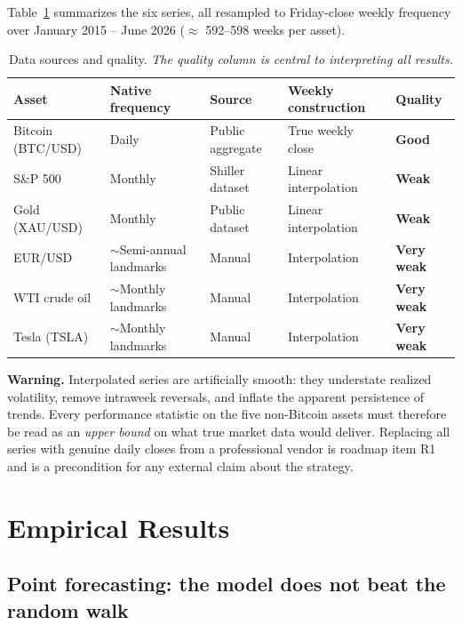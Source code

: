 \documentclass[11pt,a4paper]{article}
\begin{document}
Table~\ref{tab:data} summarizes the six series, all resampled to Friday-close weekly frequency over January 2015 -- June 2026 ($\approx$ 592--598 weeks per asset).

\begin{table}[H]
\centering\small
\caption{Data sources and quality. \emph{The quality column is central to interpreting all results.}}
\label{tab:data}
\begin{tabular}{lllll}
\toprule
Asset & Native frequency & Source & Weekly construction & Quality \\
\midrule
Bitcoin (BTC/USD) & Daily & Public aggregate & True weekly close & \textbf{Good} \\
S\&P 500 & Monthly & Shiller dataset & Linear interpolation & \textbf{Weak} \\
Gold (XAU/USD) & Monthly & Public dataset & Linear interpolation & \textbf{Weak} \\
EUR/USD & $\sim$Semi-annual landmarks & Manual & Interpolation & \textbf{Very weak} \\
WTI crude oil & $\sim$Monthly landmarks & Manual & Interpolation & \textbf{Very weak} \\
Tesla (TSLA) & $\sim$Monthly landmarks & Manual & Interpolation & \textbf{Very weak} \\
\bottomrule
\end{tabular}
\end{table}

\noindent\textbf{Warning.} Interpolated series are artificially smooth: they understate realized volatility, remove intraweek reversals, and inflate the apparent persistence of trends. Every performance statistic on the five non-Bitcoin assets must therefore be read as an \emph{upper bound} on what true market data would deliver. Replacing all series with genuine daily closes from a professional vendor is roadmap item R1 and is a precondition for any external claim about the strategy.

\section{Empirical Results}\label{sec:results}

\subsection{Point forecasting: the model does not beat the random walk}
\end{document}
